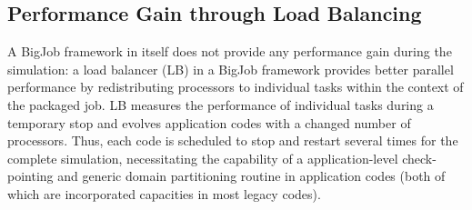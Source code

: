 \documentclass[preprint,12pt]{elsarticle}
\begin{document}
\subsection{Performance Gain through Load Balancing}
\label{sec:performance_LoadBalancing}

A BigJob framework in itself does not provide any performance gain during the simulation: a load balancer (LB) in a BigJob framework provides better parallel performance by redistributing processors to individual tasks within the context of the packaged job. LB measures the performance of individual tasks during a temporary stop and evolves application codes with a changed number of processors. Thus, each code is scheduled to stop and restart several times for the complete simulation, necessitating the capability of a application-level check-pointing and generic domain partitioning routine in application codes (both of which are incorporated capacities in most legacy codes).

\end{document}

